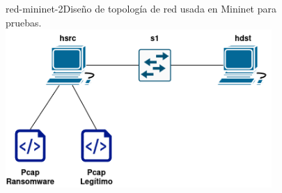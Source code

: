 \begin{figure}[Topología de Red Final]{red-mininet-2}{Diseño de topología de red usada en Mininet para pruebas.}
	\includegraphics[width=0.9\textwidth]{capturas/DiagramaRedArbol2.png}
\end{figure}

